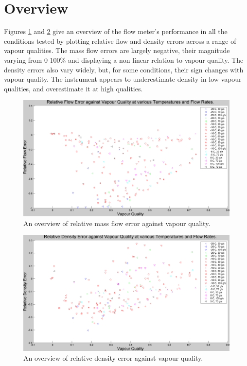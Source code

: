 \documentclass{report}
\begin{document}
\section{Overview}
\FloatBarrier
Figures \ref{plot:1} and \ref{plot:2} give an overview of the flow meter's performance in all the conditions tested by plotting relative flow and density errors across a range of vapour qualities. The mass flow errors are largely negative, their magnitude varying from 0-100\% and displaying a non-linear relation to vapour quality. The density errors also vary widely, but, for some conditions, their sign changes with vapour quality. The instrument appears to underestimate density in low vapour qualities, and overestimate it at high qualities.\\
\begin{figure}
\includegraphics[width=\textwidth]{plots/fig1}
\caption{An overview of relative mass flow error against vapour quality.}
\label{plot:1}
\end{figure}
\begin{figure}
\includegraphics[width=\textwidth]{plots/fig2}
\caption{An overview of relative density error against vapour quality.}
\label{plot:2}
\end{figure}
\end{document}
